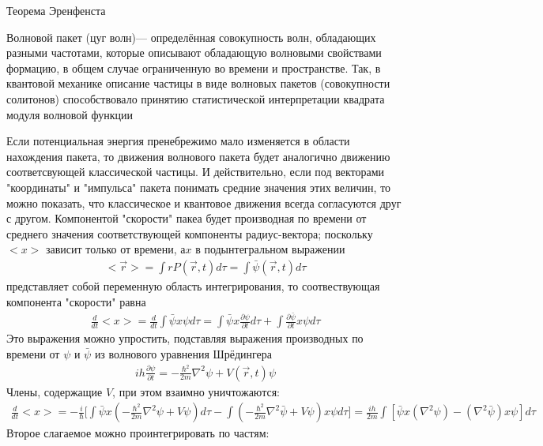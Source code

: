 \documentclass[__main__.tex]{subfiles}
\begin{document}
	Теорема Эренфенста\\
	
	\begin{definition}
		Волновой пакет (цуг волн)— определённая совокупность волн, обладающих разными частотами, которые описывают обладающую волновыми свойствами формацию, в общем случае ограниченную во времени и пространстве. Так, в квантовой механике описание частицы в виде волновых пакетов (совокупности солитонов) способствовало принятию статистической интерпретации квадрата модуля волновой функции
	\end{definition}
	
	Если потенциальная энергия пренебрежимо мало изменяется в области нахождения пакета, то движения волнового пакета будет аналогично движению соответсвующей классической частицы. И действительно, если под векторами "координаты" и "импульса" пакета понимать средние значения этих величин, то можно показать, что  классическое и квантовое движения всегда согласуются друг с другом. Компонентой "скорости" пакеа будет производная по времени от среднего значения соответствующей компоненты радиус-вектора; поскольку $<x>$ зависит только от времени, $а x$ в подынтегральном выражении 
	\begin{gather*}
	<\vec{r}>	= \int{rP(\vec{r},t)}d\tau = \int{\bar{\psi}(\vec{r},t)d\tau}
	\end{gather*}
	представляет собой переменную область интегрирования, то соотвествующая компонента "скорости" равна
	\begin{gather*}
	\frac{d}{dt}<x> = \frac{d}{dt}\int{\bar{\psi}x\psi}d\tau = \int{\bar{\psi}x\frac{\partial{\psi}}{\partial{t}}d\tau} + \int{\frac{\partial{\bar{\psi}}}{\partial{t}}x\psi d\tau}
	\end{gather*}
	Это выражения можно упростить, подставляя выражения производных по времени от $\psi$ и $\bar{\psi}$ из волнового уравнения Шрёдингера
	\begin{gather*}
	ih\frac{\partial{\psi}}{\partial{t}} = -\frac{\hbar^2}{2m}\nabla^2\psi + V(\vec{r},t)\psi
	\end{gather*}
	Члены, содержащие $V$, при этом взаимно уничтожаются:
	\begin{gather*}
	\frac{d}{dt}<x> = -\frac{i}{\hbar}\big[\int{\bar{\psi}x(-\frac{\hbar^2}{2m}\nabla^2\psi + V\psi)d\tau} - \int{(-\frac{\hbar^2}{2m}\nabla^2\bar{\psi} + V\psi)x\psi d\tau}\big] = \frac{ih}{2m}\int{[\bar{\psi}x(\nabla^2\psi)-(\nabla^2\bar{\psi})x\psi]d\tau} 
	\end{gather*}
	Второе слагаемое можно проинтегрировать по частям:
\end{document}
